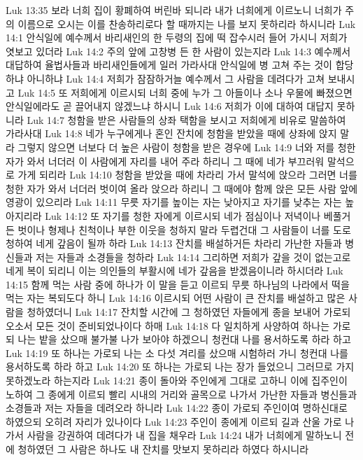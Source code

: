 Luk 13:35  보라 너희 집이 황폐하여 버린바 되니라 내가 너희에게 이르노니 너희가 주의 이름으로 오시는 이를 찬송하리로다 할 때까지는 나를 보지 못하리라 하시니라
Luk 14:1  안식일에 예수께서 바리새인의 한 두령의 집에 떡 잡수시러 들어 가시니 저희가 엿보고 있더라
Luk 14:2  주의 앞에 고창병 든 한 사람이 있는지라
Luk 14:3  예수께서 대답하여 율법사들과 바리새인들에게 일러 가라사대 안식일에 병 고쳐 주는 것이 합당하냐 아니하냐
Luk 14:4  저희가 잠잠하거늘 예수께서 그 사람을 데려다가 고쳐 보내시고
Luk 14:5  또 저희에게 이르시되 너희 중에 누가 그 아들이나 소나 우물에 빠졌으면 안식일에라도 곧 끌어내지 않겠느냐 하시니
Luk 14:6  저희가 이에 대하여 대답지 못하니라
Luk 14:7  청함을 받은 사람들의 상좌 택함을 보시고 저희에게 비유로 말씀하여 가라사대
Luk 14:8  네가 누구에게나 혼인 잔치에 청함을 받았을 때에 상좌에 앉지 말라 그렇지 않으면 너보다 더 높은 사람이 청함을 받은 경우에
Luk 14:9  너와 저를 청한 자가 와서 너더러 이 사람에게 자리를 내어 주라 하리니 그 때에 네가 부끄러워 말석으로 가게 되리라
Luk 14:10  청함을 받았을 때에 차라리 가서 말석에 앉으라 그러면 너를 청한 자가 와서 너더러 벗이여 올라 앉으라 하리니 그 때에야 함께 앉은 모든 사람 앞에 영광이 있으리라
Luk 14:11  무릇 자기를 높이는 자는 낮아지고 자기를 낮추는 자는 높아지리라
Luk 14:12  또 자기를 청한 자에게 이르시되 네가 점심이나 저녁이나 베풀거든 벗이나 형제나 친척이나 부한 이웃을 청하지 말라 두렵건대 그 사람들이 너를 도로 청하여 네게 갚음이 될까 하라
Luk 14:13  잔치를 배설하거든 차라리 가난한 자들과 병신들과 저는 자들과 소경들을 청하라
Luk 14:14  그리하면 저희가 갚을 것이 없는고로 네게 복이 되리니 이는 의인들의 부활시에 네가 갚음을 받겠음이니라 하시더라
Luk 14:15  함께 먹는 사람 중에 하나가 이 말을 듣고 이르되 무릇 하나님의 나라에서 떡을 먹는 자는 복되도다 하니
Luk 14:16  이르시되 어떤 사람이 큰 잔치를 배설하고 많은 사람을 청하였더니
Luk 14:17  잔치할 시간에 그 청하였던 자들에게 종을 보내어 가로되 오소서 모든 것이 준비되었나이다 하매
Luk 14:18  다 일치하게 사양하여 하나는 가로되 나는 밭을 샀으매 불가불 나가 보아야 하겠으니 청컨대 나를 용서하도록 하라 하고
Luk 14:19  또 하나는 가로되 나는 소 다섯 겨리를 샀으매 시험하러 가니 청컨대 나를 용서하도록 하라 하고
Luk 14:20  또 하나는 가로되 나는 장가 들었으니 그러므로 가지 못하겠노라 하는지라
Luk 14:21  종이 돌아와 주인에게 그대로 고하니 이에 집주인이 노하여 그 종에게 이르되 빨리 시내의 거리와 골목으로 나가서 가난한 자들과 병신들과 소경들과 저는 자들을 데려오라 하니라
Luk 14:22  종이 가로되 주인이여 명하신대로 하였으되 오히려 자리가 있나이다
Luk 14:23  주인이 종에게 이르되 길과 산울 가로 나가서 사람을 강권하여 데려다가 내 집을 채우라
Luk 14:24  내가 너희에게 말하노니 전에 청하였던 그 사람은 하나도 내 잔치를 맛보지 못하리라 하였다 하시니라
